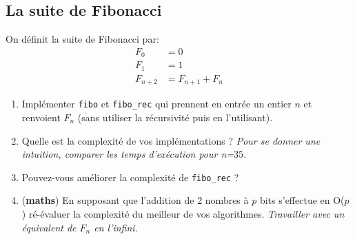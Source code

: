 \subsection{La suite de Fibonacci}
On définit la suite de Fibonacci par:
\begin{align*}
F_0 & = 0 \\
F_1 & = 1 \\
F_{n+2} & = F_{n+1} + F_n
\end{align*}

\begin{enumerate}
\item Implémenter \texttt{fibo} et \texttt{fibo\_rec}  qui prennent en entrée un entier $n$ et renvoient $F_n$ (sans utiliser la récursivité puis en l'utilisant).
\item Quelle est la complexité de vos implémentations ? \textit{Pour se donner une intuition, comparer les temps d'exécution pour n=$35$.}
\item Pouvez-vous améliorer la complexité de \texttt{fibo\_rec} ?
\item (\textbf{maths}) En supposant que l'addition de 2 nombres à $p$ bits s'effectue en O($p$) ré-évaluer la complexité du meilleur de vos algorithmes. \textit{Travailler avec un équivalent de $F_n$ en l'infini.}
\end{enumerate}